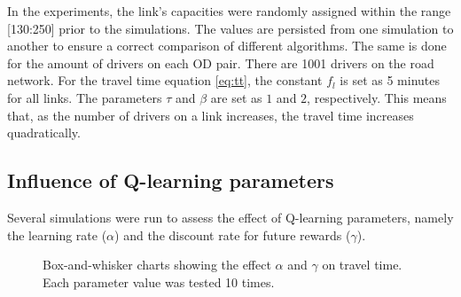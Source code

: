 \documentclass[12pt]{llncs}
\newcommand{\fftt}{\ensuremath{f_l}} 		%
\begin{document}
In the experiments, the link's capacities were randomly assigned within the range [130:250] prior to the simulations. The values are persisted from one simulation to another to ensure a correct comparison of different algorithms. The same is done for the amount of drivers on each OD pair. There are 1001 drivers on the road network. For the travel time equation \eqref{eq:tt}, the
constant $\fftt$ is set as 5 minutes for all links. The parameters  $\tau$ and $\beta$ are set as $1$ and $2$, respectively. This means that, as the number of drivers on a link increases, the travel time increases quadratically. 

\subsection{Influence of Q-learning parameters}

Several simulations were run to assess the effect of Q-learning parameters, namely the learning rate ($\alpha$) and the discount rate for future rewards ($\gamma$).

\begin{figure}[ht]
  \centering
  \caption{Box-and-whisker charts showing the effect $\alpha$ and $\gamma$ on travel time. Each parameter value was tested 10 times.}
  \label{fig:qLearningParams}
\end{figure}
\end{document}
